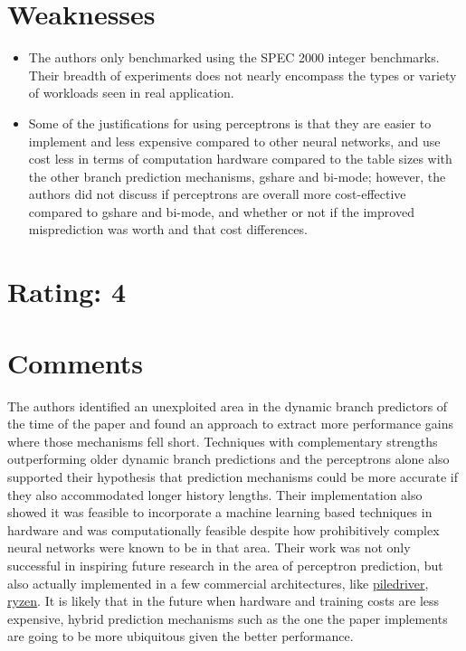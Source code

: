 \documentclass [12pt]{article}
\begin{document}
    \section{Weaknesses} %
    \label{sec:weaknesses}
        \begin{itemize}
            \item The authors only benchmarked using the SPEC 2000 integer benchmarks. Their breadth of experiments does not nearly encompass the types or variety of workloads seen in real application. 
            \item Some of the justifications for using perceptrons is that they are easier to implement and less expensive compared to other neural networks, and use cost less in terms of computation hardware compared to the table sizes with the other branch prediction mechanisms, gshare and bi-mode; however, the authors did not discuss if perceptrons are overall more cost-effective compared to gshare and bi-mode, and whether or not if the improved misprediction was worth and that cost differences. 
        \end{itemize}

    \section{Rating: 4} %
    \label{sec:rating}

    \section{Comments} %
    \label{sec:comments}


    The authors identified an unexploited area in the dynamic branch predictors of the time of the paper and found an approach to extract more performance gains where those mechanisms fell short. Techniques with complementary strengths outperforming older dynamic branch predictions and the perceptrons alone also supported their hypothesis that prediction mechanisms could be more accurate if they also accommodated longer history lengths. Their implementation also showed it was feasible to incorporate a machine learning based techniques in hardware and was computationally feasible despite how prohibitively complex neural networks were known to be in that area. Their work was not only successful in inspiring future research in the area of perceptron prediction, but also actually implemented in a few commercial architectures, like \href{https://en.wikipedia.org/wiki/Piledriver_(microarchitecture)}{piledriver}, \href{https://en.wikipedia.org/wiki/Ryzen}{ryzen}. It is likely that in the future when hardware and training costs are less expensive, hybrid prediction mechanisms such as the one the paper implements are going to be more ubiquitous given the better performance. 
\end{document}
